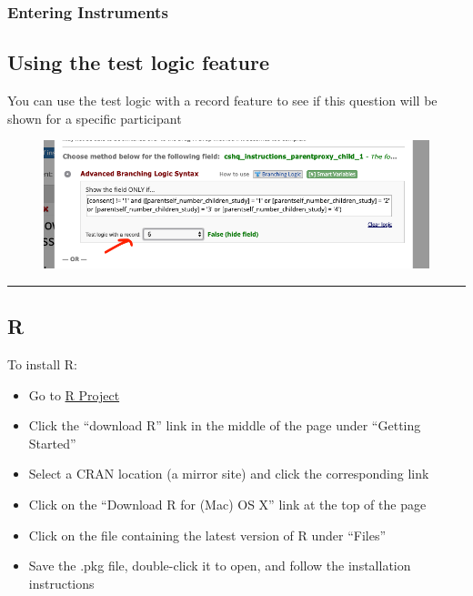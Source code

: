 \documentclass[]{book}
\providecommand{\tightlist}{%
  \setlength{\itemsep}{0pt}\setlength{\parskip}{0pt}}
\begin{document}
\hypertarget{entering-instruments}{%
\subsubsection{Entering Instruments}\label{entering-instruments}}

\hypertarget{using-the-test-logic-feature}{%
\subsection{Using the test logic feature}\label{using-the-test-logic-feature}}

You can use the test logic with a record feature to see if this question will be shown for a specific participant

\begin{figure}
\centering
\includegraphics{images/lab_protocols/redcap/1.png}
\caption{}
\end{figure}

\begin{center}\rule{0.5\linewidth}{0.5pt}\end{center}

\hypertarget{r}{%
\subsection{R}\label{r}}

To install R:

\begin{itemize}
\tightlist
\item
  Go to \href{http://www.r-project.org}{R Project}
\item
  Click the ``download R'' link in the middle of the page under ``Getting Started''
\item
  Select a CRAN location (a mirror site) and click the corresponding link
\item
  Click on the ``Download R for (Mac) OS X'' link at the top of the page
\item
  Click on the file containing the latest version of R under ``Files''
\item
  Save the .pkg file, double-click it to open, and follow the installation instructions
\end{itemize}
\end{document}
